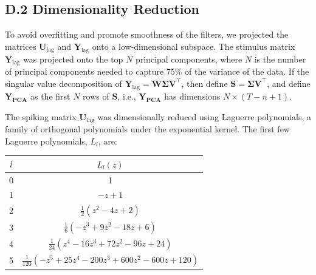 \subsection*{D.2 Dimensionality Reduction}
To avoid overfitting and promote smoothness of the filters, we projected the matrices $\mathbf{U}_{\text{lag}}$ and $\mathbf{Y}_{\text{lag}}$ onto a low-dimensional subspace. The stimulus matrix $\mathbf{Y}_{\text{lag}}$ was projected onto the top $N$ principal components, where $N$ is the number of principal components needed to capture 75\% of the variance of the data. If the singular value decomposition of $\mathbf{Y}_{\text{lag}} = \mathbf{W\Sigma V}^\top$,
then define $\mathbf{S} = \mathbf{\Sigma V^\top}$, and define $\mathbf{Y_{\text{PCA}}}$ as the first $N$ rows of $\mathbf{S}$, i.e., $\mathbf{Y_{\text{PCA}}}$  has dimensions $N \times (T-n+1)$.

The spiking matrix $\mathbf{U}_{\text{lag}}$ was dimensionally reduced using Laguerre polynomials, a family of orthogonal polynomials under the exponential kernel. The first few Laguerre polynomials, $L_l$, are: %
\vspace{-0.1in}
\begin{table}[htbp]
\centering
\begin{tabular}{cc}
\hline
$l$ & $L_l(z)$ \\%
\hline
0 & 1 \\%
1 & $-z + 1$ \\%
2 & $\frac{1}{2}(z^2 - 4z + 2)$ \\%
3 & $\frac{1}{6}(-z^3 + 9z^2 - 18z + 6)$ \\%
4 & $\frac{1}{24}(z^4 - 16z^3 + 72z^2 - 96z + 24)$ \\%
5 & $\frac{1}{120}(-z^5 + 25z^4 - 200z^3 + 600z^2 - 600z + 120)$ \\%
\hline
\end{tabular}
\end{table}

